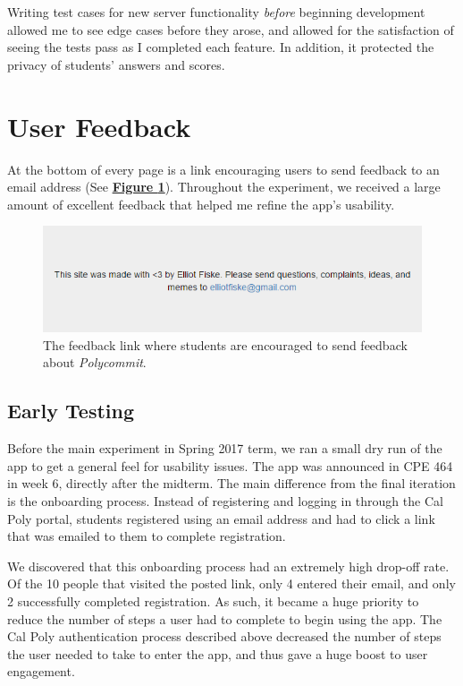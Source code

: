 \par Writing test cases for new server functionality \textit{before} beginning development allowed me to see edge cases before they arose, and allowed for the satisfaction of seeing the tests pass as I completed each feature. In addition, it protected the privacy of students' answers and scores.



\section{User Feedback}
\par At the bottom of every page is a link encouraging users to send feedback to an email address (See \textbf{\hyperref[fig:feedbacklink]{Figure \ref*{fig:feedbacklink}}}). Throughout the experiment, we received a large amount of excellent feedback that helped me refine the app's usability.

\begin{figure}
	\includegraphics[width=1.1\linewidth]{figures/feedbacklink}
	\caption{The feedback link where students are encouraged to send feedback about \textit{Polycommit}.}
	\label{fig:feedbacklink}
\end{figure}

\subsection{Early Testing}
\par Before the main experiment in Spring 2017 term, we ran a small dry run of the app to get a general feel for usability issues. The app was announced in CPE 464 in week 6, directly after the midterm. The main difference from the final iteration is the onboarding process. Instead of registering and logging in through the Cal Poly portal, students registered using an email address and had to click a link that was emailed to them to complete registration.

\par We discovered that this onboarding process had an extremely high drop-off rate. Of the 10 people that visited the posted link, only 4 entered their email, and only 2 successfully completed registration. As such, it became a huge priority to reduce the number of steps a user had to complete to begin using the app. The Cal Poly authentication process described above decreased the number of steps the user needed to take to enter the app, and thus gave a huge boost to user engagement.
